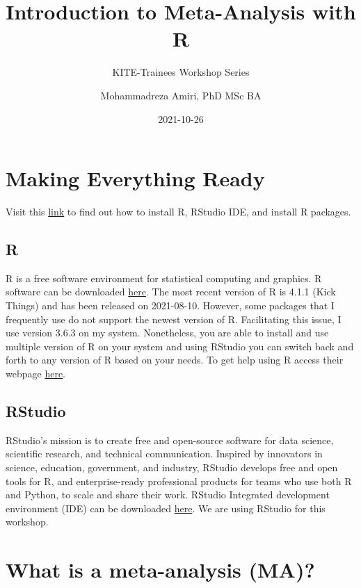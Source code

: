 \documentclass[
  11pt,
]{article}
\title{Introduction to Meta-Analysis with R}
\subtitle{KITE-Trainees Workshop Series}
\author{Mohammadreza Amiri, PhD MSc BA}
\date{2021-10-26}
\begin{document}
\maketitle

{
\hypersetup{linkcolor=}
\setcounter{tocdepth}{2}
\tableofcontents
}
\hypertarget{making-everything-ready}{%
\section{Making Everything Ready}\label{making-everything-ready}}

Visit this \href{https://learnr-examples.shinyapps.io/ex-setup-r/}{link} to find out how to install R, RStudio IDE, and install R packages.

\hypertarget{r}{%
\subsection{R}\label{r}}

R is a free software environment for statistical computing and graphics. R software can be downloaded \href{https://www.r-project.org/}{here}. The most recent version of R is 4.1.1 (Kick Things) and has been released on 2021-08-10. However, some packages that I frequently use do not support the newest version of R. Facilitating this issue, I use version 3.6.3 on my system. Nonetheless, you are able to install and use multiple version of R on your system and using RStudio you can switch back and forth to any version of R based on your needs. To get help using R access their webpage \href{https://www.r-project.org/help.html}{here}.

\hypertarget{rstudio}{%
\subsection{RStudio}\label{rstudio}}

RStudio's mission is to create free and open-source software for data science, scientific research, and technical communication. Inspired by innovators in science, education, government, and industry, RStudio develops free and open tools for R, and enterprise-ready professional products for teams who use both R and Python, to scale and share their work. RStudio Integrated development environment (IDE) can be downloaded \href{https://www.rstudio.com/products/rstudio/download/}{here}. We are using RStudio for this workshop.

\hypertarget{what-is-a-meta-analysis-ma}{%
\section{What is a meta-analysis (MA)?}\label{what-is-a-meta-analysis-ma}}
\end{document}
